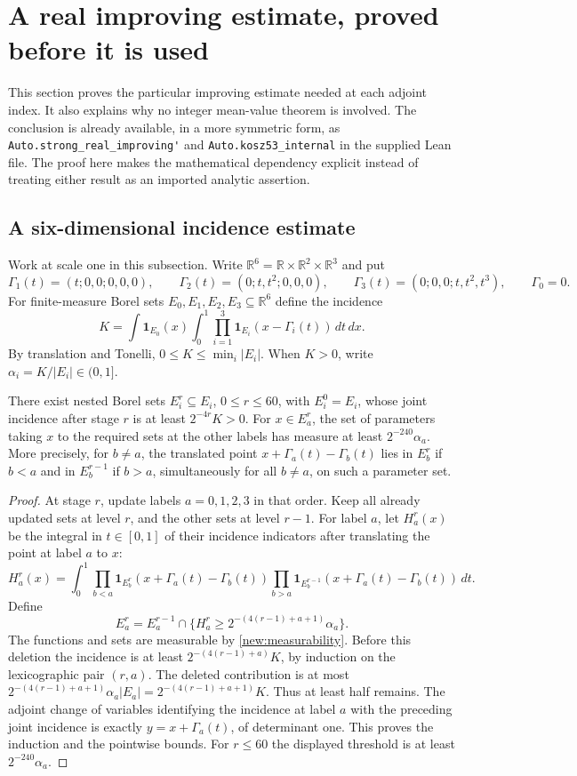 \documentclass[11pt]{article}
\theoremstyle{definition}
\newcommand{\pid}[1]{\nolinkurl{#1}}
\newcommand{\one}{\mathbf 1}
\newcommand{\R}{\mathbb R}
\begin{document}
\section{A real improving estimate, proved before it is used}\label{new:improving-section}
This section proves the particular improving estimate needed at each adjoint index.
It also explains why no integer mean-value theorem is involved. The conclusion is already
available, in a more symmetric form, as \pid{Auto.strong_real_improving'} and
\pid{Auto.kosz53_internal} in the supplied Lean file. The proof here makes the mathematical
dependency explicit instead of treating either result as an imported analytic assertion.

\subsection{A six-dimensional incidence estimate}
Work at scale one in this subsection. Write $\R^6=\R\times\R^2\times\R^3$ and put
\[
 \Gamma_1(t)=(t;0,0;0,0,0),\qquad
 \Gamma_2(t)=(0;t,t^2;0,0,0),\qquad
 \Gamma_3(t)=(0;0,0;t,t^2,t^3),\qquad \Gamma_0=0.
\]
For finite-measure Borel sets $E_0,E_1,E_2,E_3\subseteq\R^6$ define the incidence
\[
 K=\int\one_{E_0}(x)\int_0^1\prod_{i=1}^3\one_{E_i}(x-\Gamma_i(t))\,dt\,dx.
\]
By translation and Tonelli, $0\leq K\leq\min_i|E_i|$. When $K>0$, write
$\alpha_i=K/|E_i|\in(0,1]$.

\begin{lemma}\label{new:refinements}
There exist nested Borel sets $E_i^r\subseteq E_i$, $0\leq r\leq60$, with $E_i^0=E_i$,
whose joint incidence after stage $r$ is at least $2^{-4r}K>0$.
For $x\in E_a^r$, the set of parameters taking $x$ to the required sets at the other labels
has measure at least $2^{-240}\alpha_a$. More precisely, for $b\ne a$, the translated point
$x+\Gamma_a(t)-\Gamma_b(t)$ lies in $E_b^r$ if $b<a$ and in $E_b^{r-1}$ if $b>a$,
simultaneously for all $b\ne a$, on such a parameter set.
\end{lemma}
\begin{proof}
At stage $r$, update labels $a=0,1,2,3$ in that order. Keep all already updated sets at level
$r$, and the other sets at level $r-1$. For label $a$, let $H_a^r(x)$ be the integral in
$t\in[0,1]$ of their incidence indicators after translating the point at label $a$ to $x$:
\[
 H_a^r(x)=\int_0^1\prod_{b<a}\one_{E_b^r}(x+\Gamma_a(t)-\Gamma_b(t))
                       \prod_{b>a}\one_{E_b^{r-1}}(x+\Gamma_a(t)-\Gamma_b(t))\,dt.
\]
Define
\[
 E_a^r=E_a^{r-1}\cap\{H_a^r\geq2^{-(4(r-1)+a+1)}\alpha_a\}.
\]
The functions and sets are measurable by \cref{new:measurability}. Before this deletion the
incidence is at least $2^{-(4(r-1)+a)}K$, by induction on the lexicographic pair $(r,a)$.
The deleted contribution is at most
$2^{-(4(r-1)+a+1)}\alpha_a|E_a|=2^{-(4(r-1)+a+1)}K$.
Thus at least half remains. The adjoint change of variables identifying the incidence at
label $a$ with the preceding joint incidence is exactly $y=x+\Gamma_a(t)$, of determinant one.
This proves the induction and the pointwise bounds. For $r\leq60$ the displayed threshold
is at least $2^{-240}\alpha_a$.
\end{proof}
\end{document}
